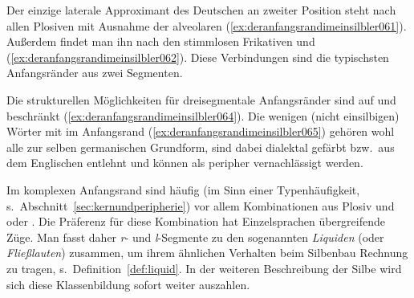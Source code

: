 Der einzige laterale Approximant des Deutschen \textipa{[l]} an zweiter Position steht nach allen Plosiven mit Ausnahme der alveolaren (\ref{ex:deranfangsrandimeinsilbler061}).
Außerdem findet man ihn nach den stimmlosen Frikativen \textipa{[f]} und \textipa{[S]} (\ref{ex:deranfangsrandimeinsilbler062}).
Diese Verbindungen sind die typischsten Anfangsränder aus zwei Segmenten.

\begin{exe}
  \ex\label{ex:deranfangsrandimeinsilbler060}
  \begin{xlist}
  \end{xlist}
\end{exe}

Die strukturellen Möglichkeiten für dreisegmentale Anfangsränder sind auf \textipa{[SpK]} und \textipa{[StK]} beschränkt (\ref{ex:deranfangsrandimeinsilbler064}).
Die wenigen (nicht einsilbigen) Wörter mit \textipa{[Spl]} im Anfangsrand (\ref{ex:deranfangsrandimeinsilbler065}) gehören wohl alle zur selben germanischen Grundform, sind dabei dialektal gefärbt bzw.\ aus dem Englischen entlehnt und können als peripher vernachlässigt werden.

\begin{exe}
  \ex\label{ex:deranfangsrandimeinsilbler063}
  \begin{xlist}
  \end{xlist}
\end{exe}

Im komplexen Anfangsrand sind häufig (im Sinn einer Typenhäufigkeit, s.\ Abschnitt~\ref{sec:kernundperipherie}) vor allem Kombinationen aus Plosiv und \textipa{[K]} oder \textipa{[l]}.
Die Präferenz für diese Kombination hat Einzelsprachen übergreifende Züge.
Man fasst daher \textit{r}- und \textit{l}-Segmente zu den sogenannten \textit{Liquiden} (oder \textit{Fließlauten}) zusammen, um ihrem ähnlichen Verhalten beim Silbenbau Rechnung zu tragen, s.\ Definition~\ref{def:liquid}.
In der weiteren Beschreibung der Silbe wird sich diese Klassenbildung sofort weiter auszahlen.


